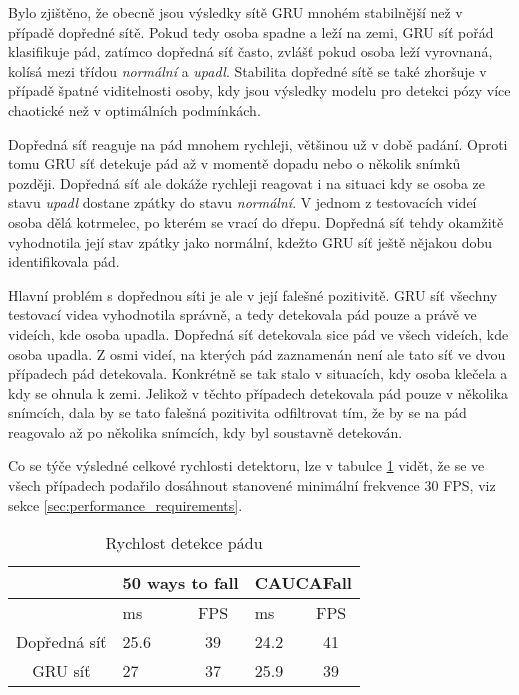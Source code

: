 Bylo zjištěno, že obecně jsou výsledky sítě GRU mnohém stabilnější než v
případě dopředné sítě. Pokud tedy osoba spadne a leží na zemi, GRU síť pořád
klasifikuje pád, zatímco dopředná síť často, zvlášť pokud osoba leží vyrovnaná,
kolísá mezi třídou \textit{normální} a \textit{upadl}. Stabilita dopředné sítě
se také zhoršuje v případě špatné viditelnosti osoby, kdy jsou výsledky modelu
pro detekci pózy více chaotické než v optimálních podmínkách.

Dopředná síť reaguje na pád mnohem rychleji, většinou už v době padání. Oproti
tomu GRU síť detekuje pád až v momentě dopadu nebo o několik snímků později.
Dopředná síť ale dokáže rychleji reagovat i na situaci kdy se osoba ze stavu
\textit{upadl} dostane zpátky do stavu \textit{normální}. V jednom z
testovacích videí osoba dělá kotrmelec, po kterém se vrací do dřepu. Dopředná
síť tehdy okamžitě vyhodnotila její stav zpátky jako normální, kdežto GRU síť
ještě nějakou dobu identifikovala pád.

Hlavní problém s dopřednou síti je ale v její falešné pozitivitě. GRU síť
všechny testovací videa vyhodnotila správně, a tedy detekovala pád pouze a
právě ve videích, kde osoba upadla. Dopředná síť detekovala sice pád ve všech
videích, kde osoba upadla. Z osmi videí, na kterých pád zaznamenán není ale
tato síť ve dvou případech pád detekovala. Konkrétně se tak stalo v situacích,
kdy osoba klečela a kdy se ohnula k zemi. Jelikož v těchto případech detekovala
pád pouze v několika snímcích, dala by se tato falešná pozitivita odfiltrovat
tím, že by se na pád reagovalo až po několika snímcích, kdy byl soustavně
detekován.

Co se týče výsledné celkové rychlosti detektoru, lze v tabulce
\ref{tab:detectorSpeed} vidět, že se ve všech případech podařilo dosáhnout
stanovené minimální frekvence $30$ FPS, viz sekce
\ref{sec:performance_requirements}.

\begin{table}[htbp]
    \centering
    \caption{Rychlost detekce pádu}
    \label{tab:detectorSpeed}
    \begin{tabular}{|c|cc|cc|}
        \hline
                     & \multicolumn{2}{l|}{50 ways to fall} & \multicolumn{2}{l|}{CAUCAFall}                                   \\ \hline
                     & \multicolumn{1}{l|}{ms}              & FPS                            & \multicolumn{1}{l|}{ms}   & FPS \\ \hline
        Dopředná síť & \multicolumn{1}{l|}{25.6}            & 39                             & \multicolumn{1}{l|}{24.2} & 41  \\ \hline
        GRU síť      & \multicolumn{1}{l|}{27}              & 37                             & \multicolumn{1}{l|}{25.9} & 39  \\ \hline
    \end{tabular}
\end{table}

